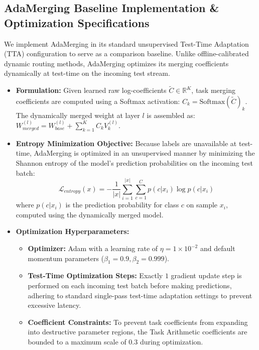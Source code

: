\documentclass{article}
\theoremstyle{plain}
\theoremstyle{definition}
\theoremstyle{remark}
\begin{document}
\subsection{AdaMerging Baseline Implementation \& Optimization Specifications}
We implement AdaMerging in its standard unsupervised Test-Time Adaptation (TTA) configuration to serve as a comparison baseline. Unlike offline-calibrated dynamic routing methods, AdaMerging optimizes its merging coefficients dynamically at test-time on the incoming test stream.
\begin{itemize}
    \item \textbf{Formulation:} Given learned raw log-coefficients $\tilde{C} \in \mathbb{R}^K$, task merging coefficients are computed using a Softmax activation: $C_k = \text{Softmax}(\tilde{C})_k$. The dynamically merged weight at layer $l$ is assembled as: $W_{merged}^{(l)} = W_{base}^{(l)} + \sum_{k=1}^K C_k V_k^{(l)}$.
    \item \textbf{Entropy Minimization Objective:} Because labels are unavailable at test-time, AdaMerging is optimized in an unsupervised manner by minimizing the Shannon entropy of the model's prediction probabilities on the incoming test batch:
    \begin{equation}
        \mathcal{L}_{entropy}(x) = - \frac{1}{|x|} \sum_{i=1}^{|x|} \sum_{c=1}^{C} p(c | x_i) \log p(c | x_i)
    \end{equation}
    where $p(c | x_i)$ is the prediction probability for class $c$ on sample $x_i$, computed using the dynamically merged model.
    \item \textbf{Optimization Hyperparameters:}
    \begin{itemize}
        \item \textbf{Optimizer:} Adam with a learning rate of $\eta = 1\times 10^{-2}$ and default momentum parameters ($\beta_1 = 0.9, \beta_2 = 0.999$).
        \item \textbf{Test-Time Optimization Steps:} Exactly $1$ gradient update step is performed on each incoming test batch before making predictions, adhering to standard single-pass test-time adaptation settings to prevent excessive latency.
        \item \textbf{Coefficient Constraints:} To prevent task coefficients from expanding into destructive parameter regions, the Task Arithmetic coefficients are bounded to a maximum scale of $0.3$ during optimization.
    \end{itemize}
\end{itemize}
\end{document}
